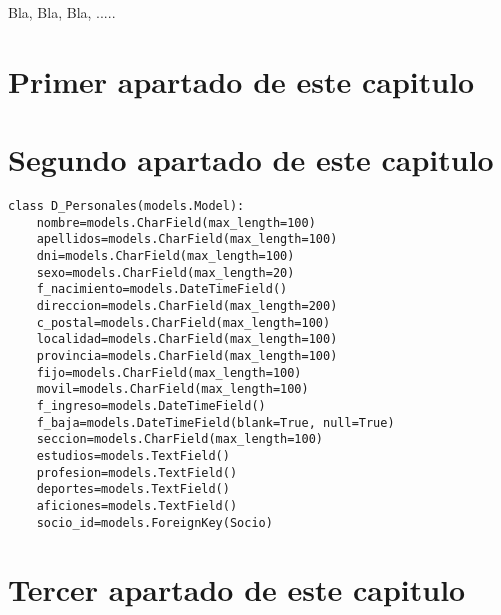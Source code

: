 


Bla, Bla, Bla, .....

\section{Primer apartado de este capitulo}
\label{3:sec1}



\section{Segundo apartado de este capitulo}
\label{3:sec2}


\begin{lstlisting}[caption={Ejemplo de listado puesto aquí}]
class D_Personales(models.Model):
    nombre=models.CharField(max_length=100)
    apellidos=models.CharField(max_length=100)
    dni=models.CharField(max_length=100)
    sexo=models.CharField(max_length=20)
    f_nacimiento=models.DateTimeField()
    direccion=models.CharField(max_length=200)
    c_postal=models.CharField(max_length=100)
    localidad=models.CharField(max_length=100)
    provincia=models.CharField(max_length=100)
    fijo=models.CharField(max_length=100)
    movil=models.CharField(max_length=100)
    f_ingreso=models.DateTimeField()
    f_baja=models.DateTimeField(blank=True, null=True)
    seccion=models.CharField(max_length=100)
    estudios=models.TextField()
    profesion=models.TextField()
    deportes=models.TextField()
    aficiones=models.TextField()
    socio_id=models.ForeignKey(Socio)
\end{lstlisting}

\section{Tercer apartado de este capitulo}
\label{:sec3}

